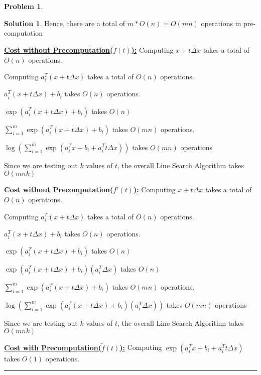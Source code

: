 \documentclass{article}
\theoremstyle{definition}
\newtheorem{problem}{Problem}
\def\fline{\rule{0.75\linewidth}{0.5pt}}
\newcommand{\finishline}{\begin{center}\fline\end{center}}
\newtheorem*{solution*}{Solution}
\newenvironment{solution}{\begin{solution*}}{{\finishline} \end{solution*}}
\begin{document}
\begin{problem}
\begin{enumerate}
\begin{solution}
        Hence, there are a total of $m * O(n) = O(mn)$ operations in pre-computation \newline

        
        \textbf{\underline{Cost without Precomputation($\tilde{f}(t)$):}} \newline 
        Computing $x + t \Delta x$ takes a total of $O(n)$ operations. 
        
        Computing $a_i^T(x + t \Delta x)$ takes a total of $O(n)$ operations. 
        
        $a_i^T(x + t\Delta x) + b_i$ takes $O(n)$ operations. 
        
        $\exp(a_i^T(x + t\Delta x) + b_i)$ takes $O(n)$  
        
        $\sum_{i=1}^{m} \exp(a_i^T(x + t\Delta x) + b_i)$ takes $O(mn)$ operations. 

        $\log(\sum_{i=1}^{m} \exp(a_i^Tx + b_i + a_i^T t\Delta x))$ takes $O(mn)$ operations
                
        Since we are testing out $k$ values of $t$, the overall Line Search Algorithm takes $O(mnk)$ \newline 
        
        \textbf{\underline{Cost without Precomputation($\tilde{f}'(t)$):}} \newline 
        Computing $x + t \Delta x$ takes a total of $O(n)$ operations. 
        
        Computing $a_i^T(x + t \Delta x)$ takes a total of $O(n)$ operations. 
        
        $a_i^T(x + t\Delta x) + b_i$ takes $O(n)$ operations. 
        
        $\exp(a_i^T(x + t\Delta x) + b_i)$ takes $O(n)$  
        
        $\exp(a_i^T(x + t\Delta x) + b_i) (a_i^T \Delta x)$ takes $O(n)$
        
        $\sum_{i=1}^{m} \exp(a_i^T(x + t\Delta x) + b_i)$ takes $O(mn)$ operations.

        $\log(\sum_{i=1}^{m} \exp(a_i^T(x + t\Delta x) + b_i) (a_i^T \Delta x))$ takes $O(mn)$ operations

                        
        Since we are testing out $k$ values of $t$, the overall Line Search Algorithm takes $O(mnk)$ \newline 
        
        
        \textbf{\underline{Cost with Precomputation($\tilde{f}(t)$):}} \newline 
        Computing $\exp(a_i^Tx + b_i + a_i^T t\Delta x)$ takes $O(1)$ operations. 
        

\end{solution}
\end{enumerate}
\end{problem}
\end{document}
